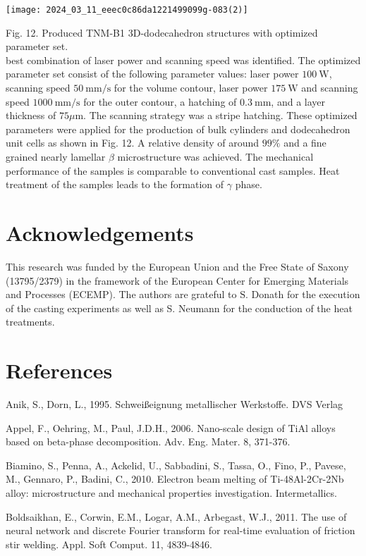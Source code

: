\documentclass[10pt]{article}
\begin{document}
\begin{center}
\texttt{[image: 2024\_03\_11\_eeec0c86da1221499099g-083(2)]}
\end{center}

Fig. 12. Produced TNM-B1 3D-dodecahedron structures with optimized parameter set.\\
best combination of laser power and scanning speed was identified. The optimized parameter set consist of the following parameter values: laser power $100 \mathrm{~W}$, scanning speed $50 \mathrm{~mm} / \mathrm{s}$ for the volume contour, laser power $175 \mathrm{~W}$ and scanning speed $1000 \mathrm{~mm} / \mathrm{s}$ for the outer contour, a hatching of $0.3 \mathrm{~mm}$, and a layer thickness of $75 \mu \mathrm{m}$. The scanning strategy was a stripe hatching. These optimized parameters were applied for the production of bulk cylinders and dodecahedron unit cells as shown in Fig. 12. A relative density of around $99 \%$ and a fine grained nearly lamellar $\beta$ microstructure was achieved. The mechanical performance of the samples is comparable to conventional cast samples. Heat treatment of the samples leads to the formation of $\gamma$ phase.

\section*{Acknowledgements}
This research was funded by the European Union and the Free State of Saxony (13795/2379) in the framework of the European Center for Emerging Materials and Processes (ECEMP). The authors are grateful to $\mathrm{S}$. Donath for the execution of the casting experiments as well as S. Neumann for the conduction of the heat treatments.

\section*{References}
Anik, S., Dorn, L., 1995. Schweißeignung metallischer Werkstoffe. DVS Verlag

Appel, F., Oehring, M., Paul, J.D.H., 2006. Nano-scale design of TiAl alloys based on beta-phase decomposition. Adv. Eng. Mater. 8, 371-376.

Biamino, S., Penna, A., Ackelid, U., Sabbadini, S., Tassa, O., Fino, P., Pavese, M., Gennaro, P., Badini, C., 2010. Electron beam melting of Ti-48Al-2Cr-2Nb alloy: microstructure and mechanical properties investigation. Intermetallics.

Boldsaikhan, E., Corwin, E.M., Logar, A.M., Arbegast, W.J., 2011. The use of neural network and discrete Fourier transform for real-time evaluation of friction stir welding. Appl. Soft Comput. 11, 4839-4846.
\end{document}
